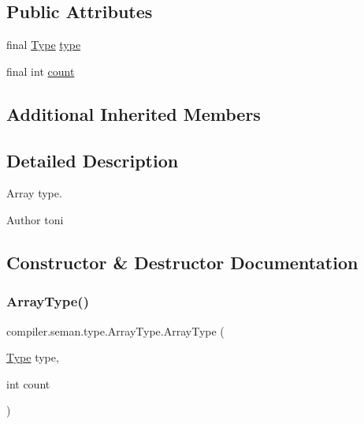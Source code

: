 \subsection*{Public Attributes}
\begin{DoxyCompactItemize}
\item 
final \hyperlink{classcompiler_1_1seman_1_1type_1_1_type}{Type} \hyperlink{classcompiler_1_1seman_1_1type_1_1_array_type_a37210dd718bff85cdb5b2054beeb7c34}{type}
\item 
final int \hyperlink{classcompiler_1_1seman_1_1type_1_1_array_type_a97ed5b302dd6a2bf187b0b23397e75ce}{count}
\end{DoxyCompactItemize}
\subsection*{Additional Inherited Members}


\subsection{Detailed Description}
Array type.

\begin{DoxyAuthor}{Author}
toni 
\end{DoxyAuthor}


\subsection{Constructor \& Destructor Documentation}
\mbox{\label{classcompiler_1_1seman_1_1type_1_1_array_type_a4d867db3983666871ffd17d9f7ed36c3}} 
\subsubsection{\texorpdfstring{Array\+Type()}{ArrayType()}}
{\footnotesize\ttfamily compiler.\+seman.\+type.\+Array\+Type.\+Array\+Type (\begin{DoxyParamCaption}\item[{\hyperlink{classcompiler_1_1seman_1_1type_1_1_type}{Type}}]{type,  }\item[{int}]{count }\end{DoxyParamCaption})}

